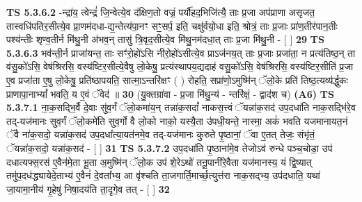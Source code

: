 \documentclass[17pt]{extarticle}
\begin{document}
                  \newline
                                \textbf{ TS 5.3.6.2} \newline
                  -न्द्रा॑य॒ त्वेन्द्रं॑ जि॒न्वेत्ये॒व द॑क्षिण॒तो वज्रं॒ पर्यौ॑हद॒भिजि॑त्यै॒ ताः प्र॒जा अप॑प्राणा असृजत॒ तास्वधि॑पतिर॒सीत्ये॒व प्रा॒णम॑दधा-द्य॒न्तेत्य॑पा॒नꣳ सꣳ॒॒सर्प॒ इति॒ चक्षु॑र्वयो॒धा इति॒ श्रोत्रं॒ ताः प्र॒जाः प्रा॑ण॒तीर॑पान॒तीः पश्य॑न्तीः शृण्व॒तीर्न मि॑थु॒नी अ॑भव॒न् तासु॑ त्रि॒वृद॒सीत्ये॒व मि॑थु॒नम॑दधा॒त् ताः प्र॒जा मि॑थु॒नी - [  ] \textbf{  29} \newline
                  \newline
                                \textbf{ TS 5.3.6.3} \newline
                  भव॑न्ती॒र्न प्राजा॑यन्त॒ ताः सꣳ॑रो॒हो॑ऽसि नीरो॒हो॑ऽसीत्ये॒व प्राऽज॑नय॒त् ताः प्र॒जाः प्रजा॑ता॒ न प्रत्य॑तिष्ठ॒न् ता व॑सु॒को॑ऽसि॒ वेष॑श्रिरसि॒ वस्य॑ष्टिर॒सीत्ये॒वैषु लो॒केषु॒ प्रत्य॑स्थापय॒द्यदाह॑ वसु॒को॑ऽसि॒ वेष॑श्रिरसि॒ वस्य॑ष्टिर॒सीति॑ प्र॒जा ए॒व प्रजा॑ता ए॒षु लो॒केषु॒ प्रति॑ष्ठापयति॒ सात्मा॒ऽन्तरि॑क्षꣳ ( ) रोहति॒ सप्रा॑णो॒ऽमुष्मि॑न् ॅलो॒के प्रति॑ तिष्ठ॒त्यव्य॑र्द्धुकः प्राणापा॒नाभ्यां᳚ भवति॒ य ए॒वं ॅवेद॑ ॥ \textbf{  30} \newline
                  \newline
                      (यु॒क्तग्रा॑वा - प्र॒जा मि॑थु॒न्य॑ - न्तरि॑क्षं॒ - द्वाद॑श च)  \textbf{(A6)} \newline \newline
                                        \textbf{ TS 5.3.7.1} \newline
                  ना॒क॒सद्भि॒र्वै दे॒वाः सु॑व॒र्गं ॅलो॒कमा॑य॒न् तन्ना॑क॒सदां᳚ नाकस॒त्त्वं ॅयन्ना॑क॒सद॑ उप॒दधा॑ति नाक॒सद्भि॑रे॒व तद्-यज॑मानः सुव॒र्गं ॅलो॒कमे॑ति सुव॒र्गो वै लो॒को नाको॒ यस्यै॒ता उ॑पधी॒यन्ते॒ नास्मा॒ अकं॑ भवति यजमानायत॒नं ॅवै ना॑क॒सदो॒ यन्ना॑क॒सद॑ उप॒दधा᳚त्या॒यत॑नमे॒व तद्-यज॑मानः कुरुते पृ॒ष्ठानां॒ ॅवा ए॒तत् तेजः॒ संभृ॑तं॒ ॅयन्ना॑क॒सदो॒ यन्ना॑क॒सद॑ - [  ] \textbf{  31} \newline
                  \newline
                                \textbf{ TS 5.3.7.2} \newline
                  उप॒दधा॑ति पृ॒ष्ठाना॑मे॒व तेजोऽव॑ रुन्धे पञ्च॒चोडा॒ उप॑ दधात्यफ्स॒रस॑ ए॒वैन॑मे॒ता भू॒ता अ॒मुष्मि॑न् ॅलो॒क उप॑ शे॒रेऽथो॑ तनू॒पानी॑रे॒वैता यज॑मानस्य॒ यं द्वि॒ष्यात् तमु॑प॒दध॑द्ध्यायेदे॒ताभ्य॑ ए॒वैनं॑ दे॒वता᳚भ्य॒ आ वृ॑श्चति ता॒जगार्ति॒मार्च्छ॒त्युत्त॑रा नाक॒सद्भ्य॒ उप॑दधाति॒ यथा॑ जा॒यामा॒नीय॑ गृ॒हेषु॑ निषा॒दय॑ति ता॒दृगे॒व तत् - [  ] \textbf{  32} \newline
\end{document}
